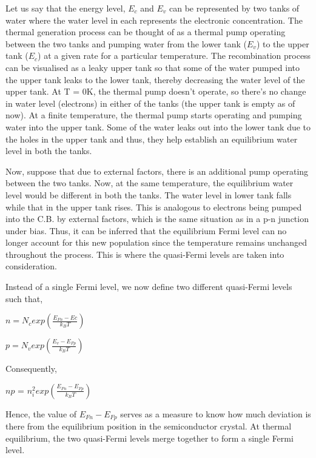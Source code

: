 \documentclass[12 pt]{article}
\begin{document}
Let us say that the energy level, $E_{c}$ and $E_{v}$ can be represented by two tanks of water where the water level in each represents the electronic concentration. The thermal generation process can be thought of as a thermal pump operating between the two tanks and pumping water from the lower tank ($E_{v}$) to the upper tank ($E_{c}$) at a given rate for a particular temperature. The recombination process can be visualised as a leaky upper tank so that some of the water pumped into the upper tank leaks to the lower tank, thereby decreasing the water level of the upper tank. At T = 0K, the thermal pump doesn't operate, so there's no change in water level (electrons) in either of the tanks (the upper tank is empty as of now). At a finite temperature, the thermal pump starts operating and pumping water into the upper tank. Some of the water leaks out into the lower tank due to the holes in the upper tank and thus, they help establish an equilibrium water level in both the tanks. \par

Now, suppose that due to external factors, there is an additional pump operating between the two tanks. Now, at the same temperature, the equilibrium water level would be different in both the tanks. The water level in lower tank falls while that in the upper tank rises. This is analogous to electrons being pumped into the C.B. by external factors, which is the same situation as in a p-n junction under bias. Thus, it can be inferred that the equilibrium Fermi level can no longer account for this new population since the temperature remains unchanged throughout the process. This is where the quasi-Fermi levels are taken into consideration.\par

Instead of a single Fermi level, we now define two different quasi-Fermi levels such that, 

\begin{center}
    $ n = N_{c}exp(\frac{E_{Fn}-E{c}}{k_{B}T}) $
\end{center}
\begin{center}
    $ p = N_{v}exp(\frac{E_{v}-E_{Fp}}{k_{B}T}) $
\end{center}
Consequently, \par
\begin{center}
    $np$ = $n_{i}^{2} exp(\frac{E_{Fn}-E_{Fp}}{k_{B}T})$
\end{center}

Hence, the value of $E_{Fn}-E_{Fp}$ serves as a measure to know how much deviation is there from the equilibrium position in the semiconductor crystal. At thermal equilibrium, the two quasi-Fermi levels merge together to form a single Fermi level. \par
\end{document}
